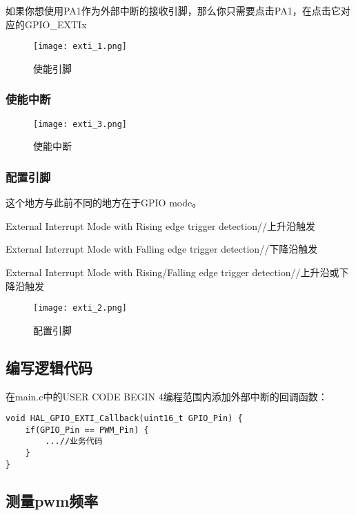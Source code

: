\documentclass[cn,11pt]{elegantbook}
\begin{document}
如果你想使用PA1作为外部中断的接收引脚，那么你只需要点击PA1，在点击它对应的GPIO\_EXTIx
\begin{figure}[htbp]
	\centering
	\texttt{[image: exti\_1.png]}
	\caption{使能引脚\label{fig:scatter}}
\end{figure}

\subsubsection{使能中断}

\begin{figure}[htbp]
	\centering
	\texttt{[image: exti\_3.png]}
	\caption{使能中断\label{fig:scatter}}
\end{figure}

\newpage

\subsubsection{配置引脚}

这个地方与此前不同的地方在于GPIO mode。

External Interrupt Mode with Rising edge trigger detection//上升沿触发

External Interrupt Mode with Falling edge trigger detection//下降沿触发

External Interrupt Mode with Rising/Falling edge trigger detection//上升沿或下降沿触发

\begin{figure}[htbp]
	\centering
	\texttt{[image: exti\_2.png]}
	\caption{配置引脚\label{fig:scatter}}
\end{figure}


\subsection{编写逻辑代码}

在main.c中的USER CODE BEGIN 4编程范围内添加外部中断的回调函数：

\newpage

\lstset{  language=C}
\begin{lstlisting}
void HAL_GPIO_EXTI_Callback(uint16_t GPIO_Pin) {
	if(GPIO_Pin == PWM_Pin) {
		...//业务代码
	}
}
\end{lstlisting}

\subsection{测量pwm频率}
\end{document}
